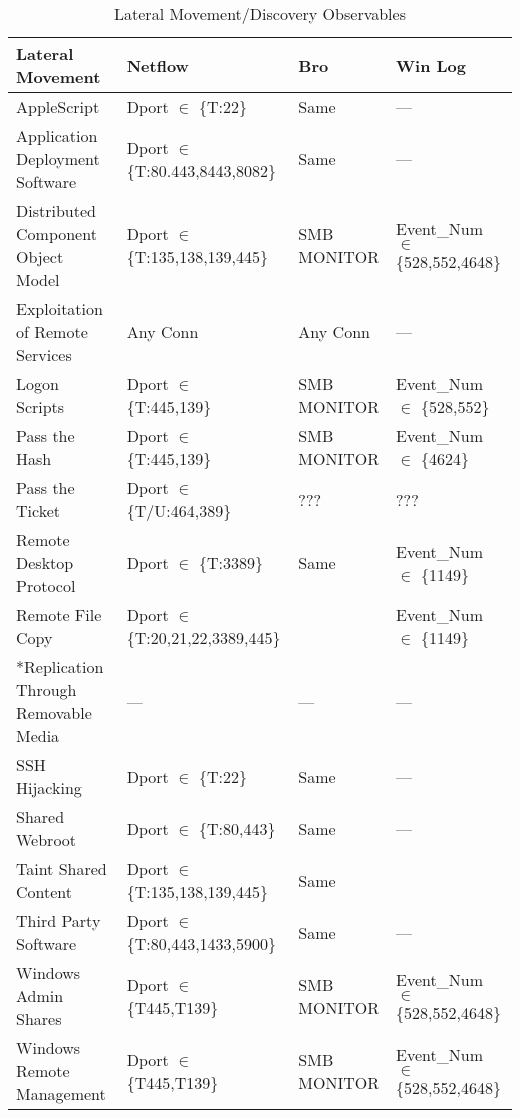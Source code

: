 \documentclass[journal]{IEEEtran}
\begin{document}
\begin{table*}[]
\centering
\caption{Lateral Movement/Discovery Observables}
\label{tab:latdisc-mech}
\begin{tabular}{|l|l|l|l|}
\hline
\rowcolor[HTML]{EFEFEF} 
\textbf{Lateral Movement}          & \textbf{Netflow} 				&  \textbf{Bro}  & \textbf{Win Log} \\\hline

AppleScript						   & Dport $\in$ \{T:22\} 			& Same	 		& --- \\\hline
Application Deployment Software    & Dport $\in$ \{T:80.443,8443,8082\} & Same		& ---\\\hline
Distributed Component Object Model & Dport $\in$ \{T:135,138,139,445\}  & SMB MONITOR & Event\_Num $\in$ \{528,552,4648\} \\\hline
Exploitation of Remote Services    & Any Conn						& Any Conn		& --- \\\hline
Logon Scripts                      & Dport $\in$ \{T:445,139\}  	& SMB MONITOR 	& Event\_Num $\in$ \{528,552\} \\\hline
Pass the Hash                      & Dport $\in$ \{T:445,139\}      & SMB MONITOR 	& Event\_Num $\in$ \{4624\} \\\hline
Pass the Ticket                    & Dport $\in$ \{T/U:464,389\}    & ??? 			& ??? \\\hline
Remote Desktop Protocol            & Dport $\in$ \{T:3389\} 		& Same			& Event\_Num $\in$ \{1149\} \\\hline
Remote File Copy                   & Dport $\in$ \{T:20,21,22,3389,445\} &  		& Event\_Num $\in$ \{1149\} \\\hline
*Replication Through Removable Media & ---					  		& ---			& --- \\\hline
SSH Hijacking                      & Dport $\in$ \{T:22\} 			& Same   		& --- \\\hline
Shared Webroot                     & Dport $\in$ \{T:80,443\}      	& Same    		& --- \\\hline
Taint Shared Content               & Dport $\in$ \{T:135,138,139,445\}  & Same		& \\\hline
Third Party Software               & Dport $\in$ \{T:80,443,1433,5900\} & Same		& --- \\\hline
Windows Admin Shares               & Dport $\in$ \{T445,T139\}       & SMB MONITOR  & Event\_Num $\in$ \{528,552,4648\} \\\hline
Windows Remote Management          & Dport $\in$ \{T445,T139\}       & SMB MONITOR  &Event\_Num $\in$ \{528,552,4648\} \\\hline


\end{tabular}
\end{table*}
\end{document}
